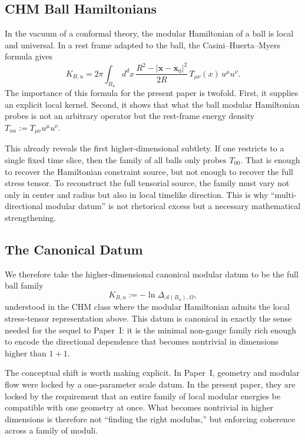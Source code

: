 \documentclass[12pt]{article}
\theoremstyle{definition}
\theoremstyle{remark}
\begin{document}
\subsection{CHM Ball Hamiltonians}\label{subsec:2.2}

In the vacuum of a conformal theory, the modular Hamiltonian of a ball is local and universal. In a rest frame adapted to the ball, the Casini--Huerta--Myers\cite{CasiniHuertaMyers2011} formula gives
\[
K_{B,u}
=
2\pi\int_{B_u} d^d x\,
\frac{R^2-|\mathbf{x}-\mathbf{x}_0|^2}{2R}\,
T_{\mu\nu}(x)\,u^\mu u^\nu.
\]
The importance of this formula for the present paper is twofold. First, it supplies an explicit local kernel. Second, it shows that what the ball modular Hamiltonian probes is not an arbitrary operator but the rest-frame energy density \(T_{uu}:=T_{\mu\nu}u^\mu u^\nu\).

This already reveals the first higher-dimensional subtlety. If one restricts to a single fixed time slice, then the family of all balls only probes \(T_{00}\). That is enough to recover the Hamiltonian constraint source, but not enough to recover the full stress tensor. To reconstruct the full tensorial source, the family must vary not only in center and radius but also in local timelike direction. This is why ``multi-directional modular datum'' is not rhetorical excess but a necessary mathematical strengthening.

\subsection{The Canonical Datum}\label{subsec:2.3}

We therefore take the higher-dimensional canonical modular datum to be the full ball family
\[
K_{B,u}:=-\ln\Delta_{\mathcal{A}(B_u),\Omega},
\]
understood in the CHM class where the modular Hamiltonian admits the local stress-tensor representation above. This datum is canonical in exactly the sense needed for the sequel to Paper~I\cite{PaperI}: it is the minimal non-gauge family rich enough to encode the directional dependence that becomes nontrivial in dimensions higher than \(1+1\).

The conceptual shift is worth making explicit. In Paper~I\cite{PaperI}, geometry and modular flow were locked by a one-parameter scale datum. In the present paper, they are locked by the requirement that an entire family of local modular energies be compatible with one geometry at once. What becomes nontrivial in higher dimensions is therefore not ``finding the right modulus,'' but enforcing coherence across a family of moduli.
\end{document}
